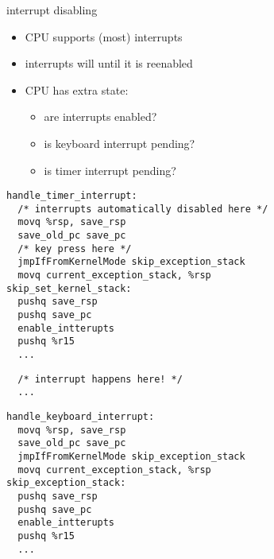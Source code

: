 \begin{frame}{interrupt disabling}
\begin{itemize}
\item CPU supports  (most) interrupts
\item interrupts will  until it is reenabled
\item CPU has extra state:
    \begin{itemize}
    \item are interrupts enabled?
    \item is keyboard interrupt pending?
    \item is timer interrupt pending?
    \end{itemize}
\end{itemize}
\end{frame}

\ifdefined\codeBoxA\else\newsavebox\codeBoxA\fi
\begin{lrbox}{\codeBoxA}
\begin{lstlisting}
handle_timer_interrupt:
  /* interrupts automatically disabled here */
  movq %rsp, save_rsp
  save_old_pc save_pc
  /* key press here */
  jmpIfFromKernelMode skip_exception_stack
  movq current_exception_stack, %rsp
skip_set_kernel_stack:
  pushq save_rsp
  pushq save_pc
  enable_intterupts
  pushq %r15
  ...
\end{lstlisting}
\end{lrbox}

\ifdefined\codeBoxB\else\newsavebox\codeBoxB\fi
\begin{lrbox}{\codeBoxB}
\begin{lstlisting}
  /* interrupt happens here! */
  ...
\end{lstlisting}
\end{lrbox}

\ifdefined\codeBoxC\else\newsavebox\codeBoxC\fi
\begin{lrbox}{\codeBoxC}
\begin{lstlisting}
handle_keyboard_interrupt:
  movq %rsp, save_rsp
  save_old_pc save_pc
  jmpIfFromKernelMode skip_exception_stack
  movq current_exception_stack, %rsp
skip_exception_stack:
  pushq save_rsp
  pushq save_pc
  enable_intterupts
  pushq %r15
  ...
\end{lstlisting}
\end{lrbox}


